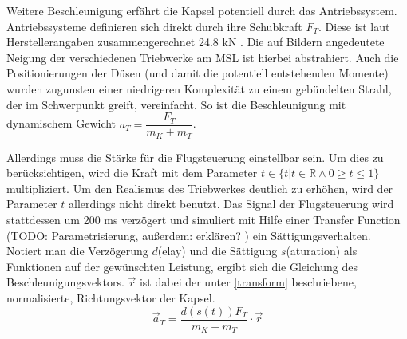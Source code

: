 Weitere Beschleunigung erfährt die Kapsel potentiell durch das Antriebssystem. Antriebssysteme definieren sich direkt durch ihre Schubkraft $F_T$. Diese ist laut Herstellerangaben zusammengerechnet 24.8 kN \cite{AerojetRocketdyne2012} \cite{AerojetRocketdyne}. Die auf Bildern angedeutete Neigung der verschiedenen Triebwerke am MSL ist hierbei abstrahiert. Auch die Positionierungen der Düsen (und damit die potentiell entstehenden Momente) wurden zugunsten einer niedrigeren Komplexität zu einem gebündelten Strahl, der im Schwerpunkt greift, vereinfacht. So ist die Beschleunigung mit dynamischem Gewicht  $ a_T = \dfrac{F_T}{m_K + m_T}$.

Allerdings muss die Stärke für die Flugsteuerung einstellbar sein. Um dies zu berücksichtigen, wird die Kraft mit dem Parameter $t \in \{t | t \in \mathbb{R} \land 0 \geq t \leq 1\}$ multipliziert. Um den Realismus des Triebwerkes deutlich zu erhöhen, wird der Parameter $t$ allerdings nicht direkt benutzt. Das Signal der Flugsteuerung wird stattdessen um 200 ms verzögert und simuliert mit Hilfe einer Transfer Function (TODO: Parametrisierung, außerdem: erklären? ) ein Sättigungsverhalten. Notiert man die Verzögerung $d$(elay) und die Sättigung $s$(aturation) als Funktionen auf der gewünschten Leistung, ergibt sich die Gleichung des Beschleunigungsvektors. $\vec r$ ist dabei der unter \ref{transform} beschriebene, normalisierte, Richtungsvektor der Kapsel.
$$\vec a_{T} = \frac{d(s(t))F_T}{m_K + m_T} \cdot \vec r$$\\